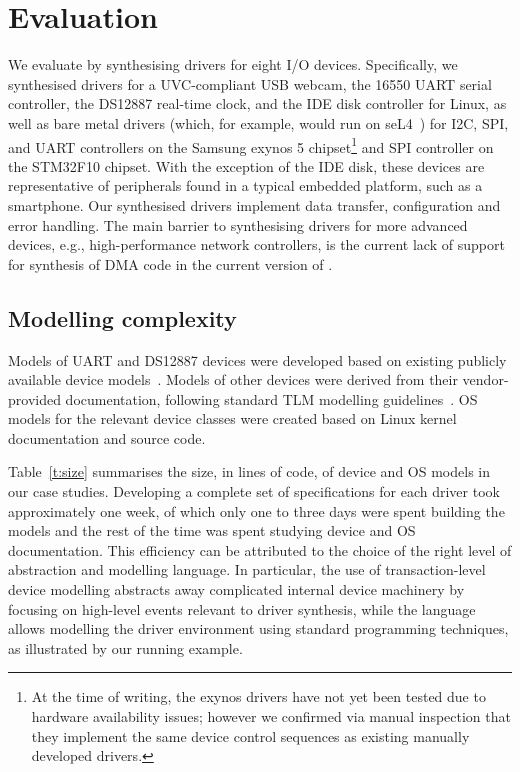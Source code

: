 \section{Evaluation}
\label{s:eval}
We evaluate \termite by synthesising drivers for eight I/O devices.  Specifically, we synthesised drivers for a UVC-compliant USB webcam, the 16550 UART serial controller, the DS12887 real-time clock, and the IDE disk controller for Linux, as well as bare metal drivers (which, for example, would run on seL4~\cite{Klein_EHACDEEKNSTW_09}) for I2C, SPI, and UART controllers on the Samsung exynos 5 chipset\footnote{At the time of writing, the exynos drivers have not yet been tested due to hardware availability issues; however we confirmed via manual inspection that they implement the same device control sequences as existing manually developed drivers.} and SPI controller on the STM32F10 chipset.  With the exception of the IDE disk, these devices are representative of peripherals found in a typical embedded platform, such as a smartphone.  Our synthesised drivers implement data transfer, configuration and error handling.  The main barrier to synthesising drivers for more advanced devices, e.g., high-performance network controllers, is the current lack of support for synthesis of DMA code in the current version of \termite.  

\subsection{Modelling complexity} 
Models of UART and DS12887 devices were developed based on existing publicly available device models~\cite{ds12887, uart}.  Models of other devices were derived from their vendor-provided documentation, following standard TLM modelling guidelines~\cite{dml_ug}.  OS models for the relevant device classes were created based on Linux kernel documentation and source code.  

Table~\ref{t:size} summarises the size, in lines of code, of device and OS models in our case studies.  Developing a complete set of specifications for each driver took approximately one week, of which only one to three days were spent building the models and the rest of the time was spent studying device and OS documentation.  This efficiency can be attributed to the choice of the right level of abstraction and modelling language.  In particular, the use of transaction-level device modelling abstracts away complicated internal device machinery by focusing on high-level events relevant to driver synthesis, while the \tsl language allows modelling the driver environment using standard programming techniques, as illustrated by our running example.


